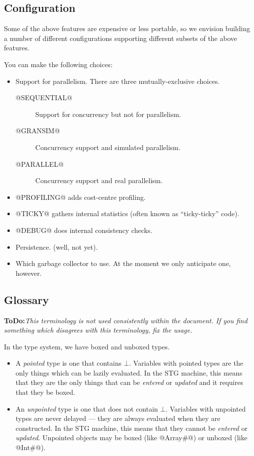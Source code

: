 \documentclass[11pt]{article}
\newcommand{\ToDo}[1]{{{\bf ToDo:}\sl #1}}
\newcommand{\Subsection}[2]{\subsection{#1}\label{sec:#2}}
\begin{document}
\Subsection{Configuration}{configuration}

Some of the above features are expensive or less portable, so we
envision building a number of different configurations supporting
different subsets of the above features.

You can make the following choices:
\begin{itemize}
\item
Support for parallelism.  There are three mutually-exclusive choices.

\begin{description}
\item[@SEQUENTIAL@] Support for concurrency but not for parallelism.
\item[@GRANSIM@]    Concurrency support and simulated parallelism.
\item[@PARALLEL@]   Concurrency support and real parallelism.
\end{description}

\item @PROFILING@ adds cost-centre profiling.

\item @TICKY@ gathers internal statistics (often known as ``ticky-ticky'' code).

\item @DEBUG@ does internal consistency checks.

\item Persistence. (well, not yet).

\item
Which garbage collector to use.  At the moment we
only anticipate one, however.
\end{itemize}

\Subsection{Glossary}{glossary}

\ToDo{This terminology is not used consistently within the document.
If you find something which disagrees with this terminology, fix the
usage.}

In the type system, we have boxed and unboxed types.

\begin{itemize}

\item A \emph{pointed} type is one that contains $\bot$.  Variables with
pointed types are the only things which can be lazily evaluated.  In
the STG machine, this means that they are the only things that can be 
\emph{entered} or \emph{updated} and it requires that they be boxed.

\item An \emph{unpointed} type is one that does not contain $\bot$.
Variables with unpointed types are never delayed --- they are always
evaluated when they are constructed.  In the STG machine, this means
that they cannot be \emph{entered} or \emph{updated}.  Unpointed objects
may be boxed (like @Array#@) or unboxed (like @Int#@).

\end{itemize}
\end{document}
